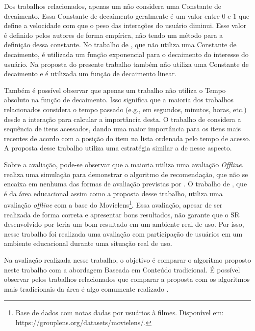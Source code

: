 Dos trabalhos relacionados, apenas um não considera uma Constante de decaimento. Essa Constante de decaimento geralmente
é um valor entre $0$ e $1$ que define a velocidade com que o peso das interações do usuário diminui. Esse valor é definido
pelos autores de forma empírica, não tendo um método para a definição dessa constante. No trabalho de ,
que não utiliza uma Constante de decaimento, é utilizada um função exponencial para o decaimento do interesse do usuário. Na
proposta do presente trabalho também não utiliza uma Constante de decaimento e é utilizada um função de decaimento linear.

Também é possível observar que apenas um trabalho não utiliza o Tempo absoluto na função de decaimento. Isso significa que
a maioria dos trabalhos relacionados considera o tempo passado (e.g., em segundos, minutos, horas, etc.) desde a interação
para calcular a importância desta. O trabalho de  considera a sequência de itens acessados, dando
uma maior importância para os itens mais recentes de acordo com a posição do item na lista ordenada pelo tempo de acesso.
A proposta desse trabalho utiliza uma estratégia similar a de  nesse aspecto.

Sobre a avaliação, pode-se observar que a maioria utiliza uma avaliação \textit{Offline}.  realiza
uma simulação para demonstrar o algoritmo de recomendação, que não se encaixa em nenhuma das formas de avaliação
previstas por . O trabalho de , que é da área educacional assim como a
proposta desse trabalho, utiliza uma avaliação \textit{offline} com a base do Movielens\footnote{Base de dados com
notas dadas por usuários à filmes. Disponível em: https://grouplens.org/datasets/movielens/.}.
Essa avaliação, apesar de ser realizada de forma correta e apresentar bons resultados, não garante que o SR desenvolvido por 
teria um bom resultado em um ambiente real de uso. Por isso, nesse trabalho foi realizada uma avaliação com
participação de usuários em um ambiente educacional durante uma situação real de uso.

Na avaliação realizada nesse trabalho, o objetivo é comparar o algoritmo proposto neste trabalho com a abordagem Baseada
em Conteúdo tradicional. É possível observar pelos trabalhos relacionados que comparar a proposta com os algoritmos mais
tradicionais da área é algo comumente realizado \cite{fan2015modeling, luo2010context, hawalah2014utilizing, qiao2015personalized, wei2013web}.

